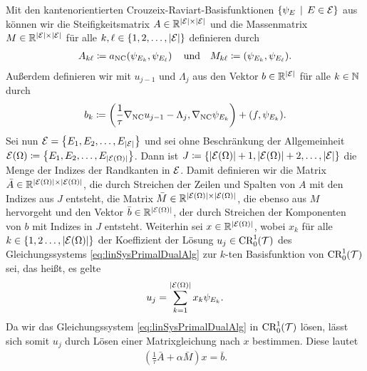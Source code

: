 \begin{remark} 
  \label{rem:primalDualMatrixEquations}
  Mit den kantenorientierten Crouzeix-Raviart-Basisfunktionen
  $\{\psi_E\,\mid\,E\in\mathcal{E}\}$ aus  können
  wir die Steifigkeitsmatrix $A\in\mathbb{R}^{|\mathcal{E}|\times|\mathcal{E}|}$ und die
  Massenmatrix $M\in\mathbb{R}^{|\mathcal{E}|\times|\mathcal{E}|}$ für alle
  $k,\ell\in\{1,2,\ldots,|\mathcal{E}|\}$ definieren durch
  \begin{align*}
    A_{k\ell}\coloneqq a_\textup{NC}\!\left(\psi_{E_k},\psi_{E_\ell}\right)
    \quad\text{und}\quad
    M_{k\ell}\coloneqq \left(\psi_{E_k},\psi_{E_\ell}\right)\!.
  \end{align*}
  Außerdem definieren wir mit $u_{j-1}$ und $\Lambda_j$ aus
   den Vektor $b\in\mathbb{R}^{|\mathcal{E}|}$ für alle
  $k\in\mathbb{N}$ durch
  \begin{align*}
    b_k\coloneqq 
    \left(\frac{1}{\tau}\nabla_\textup{NC} u_{j-1}-\Lambda_j,\nabla_\textup{NC}\psi_{E_k}\right)
    + \left( f,\psi_{E_k} \right)\!.
  \end{align*}
  Sei nun $\mathcal{E}=\left\{E_1,E_2,\ldots,E_{|\mathcal{E}|}\right\}$ und sei ohne
  Beschränkung der Allgemeinheit 
  $\mathcal{E}(\Omega)\coloneqq\left\{E_1,E_2,\ldots,E_{|\mathcal{E}(\Omega)|}\right\}$.  
  Dann ist $J\coloneqq\{|\mathcal{E}(\Omega)|+1,|\mathcal{E}(\Omega)|+2,\ldots,|\mathcal{E}|\}$
  die Menge der Indizes der Randkanten in $\mathcal{E}$.
  Damit definieren wir die Matrix $\bar
  A\in\mathbb{R}^{|\mathcal{E}(\Omega)|\times|\mathcal{E}(\Omega)|}$, die durch Streichen der
  Zeilen und Spalten von $A$ mit den Indizes aus $J$ entsteht, die Matrix $\bar
  M\in\mathbb{R}^{|\mathcal{E}(\Omega)|\times|\mathcal{E}(\Omega)|}$, die ebenso aus $M$
  hervorgeht und den Vektor $\bar b\in\mathbb{R}^{|\mathcal{E}(\Omega)|}$, der durch
  Streichen der Komponenten von $b$ mit Indizes in $J$ entsteht.
  Weiterhin sei $x\in\mathbb{R}^{|\mathcal{E}(\Omega)|}$, wobei $x_k$ für alle
  $k\in\{1,2\ldots,|\mathcal{E}(\Omega)|\}$ der Koeffizient der Lösung 
  $u_j\in\textup{CR}^1_0(\mathcal{T})$ des
  Gleichungssystems \eqref{eq:linSysPrimalDualAlg} zur $k$-ten Basisfunktion
  von $\textup{CR}^1_0(\mathcal{T})$ sei, das heißt, es gelte
  \begin{align*}
    u_j=\sum_{k=1}^{|\mathcal{E}(\Omega)|} x_k\psi_{E_k}.
  \end{align*}
  Da wir das Gleichungssystem \eqref{eq:linSysPrimalDualAlg} in
  $\textup{CR}^1_0(\mathcal{T})$ lösen, lässt sich somit $u_j$ durch Lösen einer
  Matrixgleichung nach $x$ bestimmen. 
  Diese lautet
  \begin{align}
    \label{eq:linSysPrimalDualAlgMatrixEq}
    \left(\frac{1}{\tau}\bar A+\alpha \bar M\right)x=\bar b.
  \end{align}
\end{remark}

